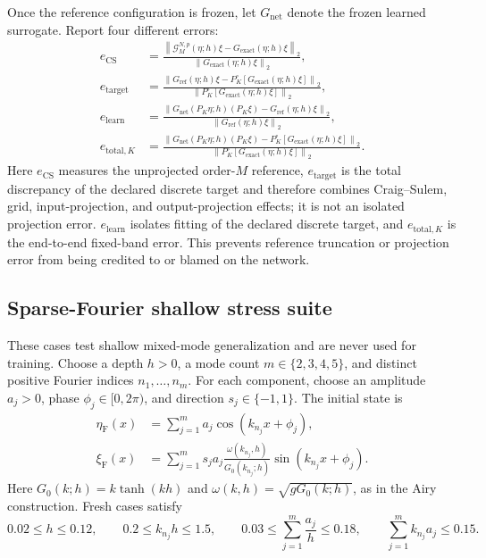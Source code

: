 \documentclass[11pt]{article}
\newcommand{\G}{\mathcal G}
\newcommand{\norm}[1]{\left\lVert #1\right\rVert}
\begin{document}
Once the reference configuration is frozen, let $G_{\mathrm{net}}$ denote
the frozen learned surrogate.  Report four different errors:
\begin{align}
  e_{\mathrm{CS}}
  &=\frac{\norm{\G^{N,p}_M(\eta;h)\xi-
                   G_{\mathrm{exact}}(\eta;h)\xi}_2}
          {\norm{G_{\mathrm{exact}}(\eta;h)\xi}_2},\\
  e_{\mathrm{target}}
  &=\frac{\norm{G_{\mathrm{ref}}(\eta;h)\xi-
                   P_K^\circ[G_{\mathrm{exact}}(\eta;h)\xi]}_2}
          {\norm{P_K^\circ[G_{\mathrm{exact}}(\eta;h)\xi]}_2},\\
  e_{\mathrm{learn}}
  &=\frac{\norm{G_{\mathrm{net}}(P_K\eta;h)(P_K\xi)-
                   G_{\mathrm{ref}}(\eta;h)\xi}_2}
          {\norm{G_{\mathrm{ref}}(\eta;h)\xi}_2},\\
  e_{\mathrm{total},K}
  &=\frac{\norm{G_{\mathrm{net}}(P_K\eta;h)(P_K\xi)-
                   P_K^\circ[G_{\mathrm{exact}}(\eta;h)\xi]}_2}
          {\norm{P_K^\circ[G_{\mathrm{exact}}(\eta;h)\xi]}_2}.
  \label{eq:manufactured-error-split}
\end{align}
Here $e_{\mathrm{CS}}$ measures the unprojected order-$M$ reference,
$e_{\mathrm{target}}$ is the total discrepancy of the declared discrete
target and therefore combines Craig--Sulem, grid, input-projection, and
output-projection effects; it is not an isolated projection error.
$e_{\mathrm{learn}}$ isolates fitting of the declared discrete target, and
$e_{\mathrm{total},K}$ is the end-to-end fixed-band error.  This
prevents reference truncation or projection error from being credited to or
blamed on the network.

\subsection{Sparse-Fourier shallow stress suite}

These cases test shallow mixed-mode generalization and are never used for
training.  Choose a depth \(h>0\), a mode count \(m\in\{2,3,4,5\}\), and
distinct positive Fourier indices \(n_1,\ldots,n_m\).  For each component,
choose an amplitude \(a_j>0\), phase \(\phi_j\in[0,2\pi)\), and direction
\(s_j\in\{-1,1\}\).  The initial state is
\begin{align}
  \eta_{\mathrm F}(x)&=\sum_{j=1}^{m}a_j\cos(k_{n_j}x+\phi_j),\\
  \xi_{\mathrm F}(x)&=\sum_{j=1}^{m}s_j a_j
       \frac{\omega(k_{n_j},h)}{G_0(k_{n_j};h)}
       \sin(k_{n_j}x+\phi_j).
  \label{eq:fourier-packet}
\end{align}
Here \(G_0(k;h)=k\tanh(kh)\) and
\(\omega(k,h)=\sqrt{gG_0(k;h)}\), as in the Airy construction.  Fresh cases
satisfy
\begin{equation}
  0.02\leq h\leq0.12,\qquad
  0.2\leq k_{n_j}h\leq1.5,\qquad
  0.03\leq\sum_{j=1}^{m}\frac{a_j}{h}\leq0.18,\qquad
  \sum_{j=1}^{m}k_{n_j}a_j\leq0.15.
  \label{eq:fourier-support}
\end{equation}
\end{document}
